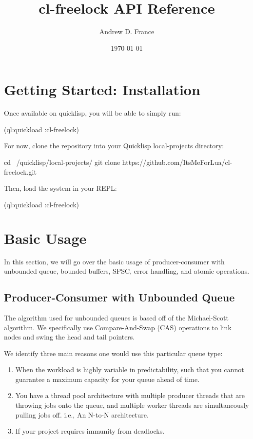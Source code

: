 \documentclass[12pt, letterpaper]{article}
\title{cl-freelock API Reference}
\author{Andrew D. France}
\date{\today}
\begin{document}
	
	\maketitle
	\newpage
	
	\tableofcontents
	\newpage
	
	\section{Getting Started: Installation}
	Once available on quicklisp, you will be able to simply run:
\begin{lispcode}
(ql:quickload :cl-freelock)
\end{lispcode}
	For now, clone the repository into your Quicklisp local-projects directory:
\begin{bashcode}
cd ~/quicklisp/local-projects/
git clone https://github.com/ItsMeForLua/cl-freelock.git
\end{bashcode}
	Then, load the system in your REPL:
\begin{lispcode}
(ql:quickload :cl-freelock)
\end{lispcode}

	\section{Basic Usage}
	In this section, we will go over the basic usage of producer-consumer with unbounded queue, bounded buffers, SPSC, error handling, and atomic operations.
	
	
	\subsection{Producer-Consumer with Unbounded Queue}
	The algorithm used for unbounded queues is based off of the Michael-Scott algorithm. We specifically use Compare-And-Swap (CAS) operations to link nodes and swing the head and tail pointers.
	
	We identify three main reasons one would use this particular queue type:
	\begin{enumerate}
		\item When the workload is highly variable in predictability, such that you cannot guarantee a maximum capacity for your queue ahead of time.
		\item You have a thread pool architecture with multiple producer threads that are throwing jobs onto the queue, and multiple worker threads are simultaneously pulling jobs off. i.e., An N-to-N architecture.
		\item If your project requires immunity from deadlocks.
	\end{enumerate}
\end{document}

